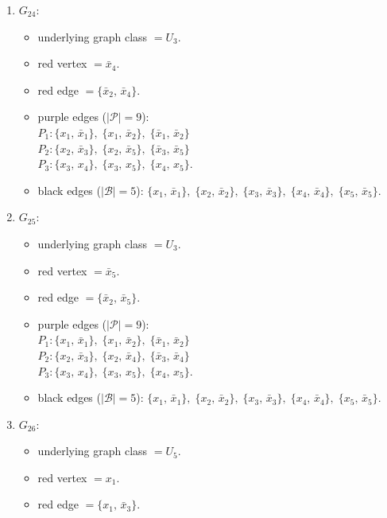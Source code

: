 \begin{enumerate}[leftmargin=*]
\begin{itemize}[leftmargin=*]
\end{itemize}
\item $G_{24}$:
\begin{itemize}[leftmargin=*]
\item underlying graph class $= U_3$.
\item red vertex $= \bar{x}_{4}$.
\item red edge $= \{\bar{x}_{2},\,\bar{x}_{4}\}$.
\item purple edges ($|\mathcal{P}|=9$):\mbox{}\\
$P_{1}: \{x_{1},\,\bar{x}_{1}\},\; \{x_{1},\,\bar{x}_{2}\},\; \{\bar{x}_{1},\,\bar{x}_{2}\}$\\
$P_{2}: \{x_{2},\,\bar{x}_{3}\},\; \{x_{2},\,\bar{x}_{5}\},\; \{\bar{x}_{3},\,\bar{x}_{5}\}$\\
$P_{3}: \{x_{3},\,x_{4}\},\; \{x_{3},\,x_{5}\},\; \{x_{4},\,x_{5}\}$.
\item black edges ($|\mathcal{B}|=5$): $\{x_{1},\,\bar{x}_{1}\},\; \{x_{2},\,\bar{x}_{2}\},\; \{x_{3},\,\bar{x}_{3}\},\; \{x_{4},\,\bar{x}_{4}\},\; \{x_{5},\,\bar{x}_{5}\}$.
\end{itemize}
\item $G_{25}$:
\begin{itemize}[leftmargin=*]
\item underlying graph class $= U_3$.
\item red vertex $= \bar{x}_{5}$.
\item red edge $= \{\bar{x}_{2},\,\bar{x}_{5}\}$.
\item purple edges ($|\mathcal{P}|=9$):\mbox{}\\
$P_{1}: \{x_{1},\,\bar{x}_{1}\},\; \{x_{1},\,\bar{x}_{2}\},\; \{\bar{x}_{1},\,\bar{x}_{2}\}$\\
$P_{2}: \{x_{2},\,\bar{x}_{3}\},\; \{x_{2},\,\bar{x}_{4}\},\; \{\bar{x}_{3},\,\bar{x}_{4}\}$\\
$P_{3}: \{x_{3},\,x_{4}\},\; \{x_{3},\,x_{5}\},\; \{x_{4},\,x_{5}\}$.
\item black edges ($|\mathcal{B}|=5$): $\{x_{1},\,\bar{x}_{1}\},\; \{x_{2},\,\bar{x}_{2}\},\; \{x_{3},\,\bar{x}_{3}\},\; \{x_{4},\,\bar{x}_{4}\},\; \{x_{5},\,\bar{x}_{5}\}$.
\end{itemize}
\item $G_{26}$:
\begin{itemize}[leftmargin=*]
\item underlying graph class $= U_5$.
\item red vertex $= x_{1}$.
\item red edge $= \{x_{1},\,\bar{x}_{3}\}$.

\end{itemize}
\end{enumerate}
